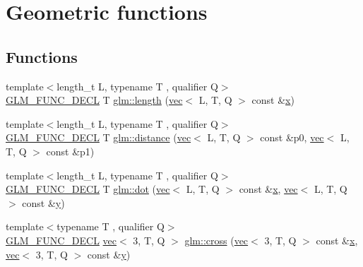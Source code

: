 \hypertarget{group__core__func__geometric}{}\section{Geometric functions}
\label{group__core__func__geometric}
\subsection*{Functions}
\begin{DoxyCompactItemize}
\item 
{\footnotesize template$<$length\+\_\+t L, typename T , qualifier Q$>$ }\\\mbox{\hyperlink{setup_8hpp_ab2d052de21a70539923e9bcbf6e83a51}{G\+L\+M\+\_\+\+F\+U\+N\+C\+\_\+\+D\+E\+CL}} T \mbox{\hyperlink{group__core__func__geometric_ga0cdabbb000834d994a1d6dc56f8f5263}{glm\+::length}} (\mbox{\hyperlink{structglm_1_1vec}{vec}}$<$ L, T, Q $>$ const \&\mbox{\hyperlink{_s_d_l__opengl_8h_ad0e63d0edcdbd3d79554076bf309fd47}{x}})
\item 
{\footnotesize template$<$length\+\_\+t L, typename T , qualifier Q$>$ }\\\mbox{\hyperlink{setup_8hpp_ab2d052de21a70539923e9bcbf6e83a51}{G\+L\+M\+\_\+\+F\+U\+N\+C\+\_\+\+D\+E\+CL}} T \mbox{\hyperlink{group__core__func__geometric_gaa68de6c53e20dfb2dac2d20197562e3f}{glm\+::distance}} (\mbox{\hyperlink{structglm_1_1vec}{vec}}$<$ L, T, Q $>$ const \&p0, \mbox{\hyperlink{structglm_1_1vec}{vec}}$<$ L, T, Q $>$ const \&p1)
\item 
{\footnotesize template$<$length\+\_\+t L, typename T , qualifier Q$>$ }\\\mbox{\hyperlink{setup_8hpp_ab2d052de21a70539923e9bcbf6e83a51}{G\+L\+M\+\_\+\+F\+U\+N\+C\+\_\+\+D\+E\+CL}} T \mbox{\hyperlink{group__core__func__geometric_gaad6c5d9d39bdc0bf43baf1b22e147a0a}{glm\+::dot}} (\mbox{\hyperlink{structglm_1_1vec}{vec}}$<$ L, T, Q $>$ const \&\mbox{\hyperlink{_s_d_l__opengl_8h_ad0e63d0edcdbd3d79554076bf309fd47}{x}}, \mbox{\hyperlink{structglm_1_1vec}{vec}}$<$ L, T, Q $>$ const \&\mbox{\hyperlink{_s_d_l__opengl_8h_a1675d9d7bb68e1657ff028643b4037e3}{y}})
\item 
{\footnotesize template$<$typename T , qualifier Q$>$ }\\\mbox{\hyperlink{setup_8hpp_ab2d052de21a70539923e9bcbf6e83a51}{G\+L\+M\+\_\+\+F\+U\+N\+C\+\_\+\+D\+E\+CL}} \mbox{\hyperlink{structglm_1_1vec}{vec}}$<$ 3, T, Q $>$ \mbox{\hyperlink{group__core__func__geometric_gaeeec0794212fe84fc9d261de067c9587}{glm\+::cross}} (\mbox{\hyperlink{structglm_1_1vec}{vec}}$<$ 3, T, Q $>$ const \&\mbox{\hyperlink{_s_d_l__opengl_8h_ad0e63d0edcdbd3d79554076bf309fd47}{x}}, \mbox{\hyperlink{structglm_1_1vec}{vec}}$<$ 3, T, Q $>$ const \&\mbox{\hyperlink{_s_d_l__opengl_8h_a1675d9d7bb68e1657ff028643b4037e3}{y}})

\end{DoxyCompactItemize}
